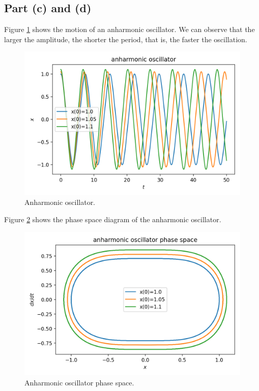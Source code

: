 \documentclass[11pt]{article}
\begin{document}
\subsection{Part (c) and (d)}
Figure \ref{fig:anharmonic} shows the motion of an anharmonic oscillator. We can observe that the larger the amplitude, the shorter the period, that is, the faster the oscillation.
\begin{figure}[H]
    \centering
    \includegraphics[scale = 0.7]{Figs/ps-9-1c.png}
    \caption{Anharmonic oscillator.}
    \label{fig:anharmonic}
\end{figure}

Figure \ref{fig:anharmonic-ps} shows the phase space diagram of the anharmonic oscillator.
\begin{figure}[H]
    \centering
    \includegraphics[scale = 0.7]{Figs/ps-9-1d.png}
    \caption{Anharmonic oscillator phase space.}
    \label{fig:anharmonic-ps}
\end{figure}
\end{document}
